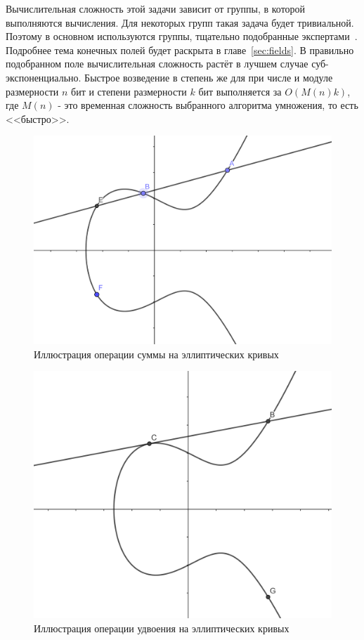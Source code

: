 \documentclass[times,specification,annotation]{itmo-student-thesis}
\begin{document}
Вычислительная сложность этой задачи зависит от группы, в которой выполняются вычисления.
Для некоторых групп такая задача будет тривиальной.
Поэтому в основном используются группы, тщательно подобранные экспертами~\cite{rfc2412}.
Подробнее тема конечных полей будет раскрыта в главе~\ref{sec:fields}.
В правильно подобранном поле вычислительная сложность растёт в лучшем случае суб-экспоненциально.
Быстрое возведение в степень же для при числе и модуле размерности $n$ бит и степени размерности $k$ бит
выполняется за $O(M(n)k)$, где $M(n)$ - это временная сложность выбранного алгоритма умножения, то есть <<быстро>>.

\begin{figure}[!h]
\caption{Иллюстрация операции суммы на эллиптических кривых}\label{fig:ec_sum}
\includegraphics[width=15cm]{graphics/ec_summation.png}
\end{figure}
\begin{figure}[!h]
\caption{Иллюстрация операции удвоения на эллиптических кривых}\label{fig:ec_doub}
\includegraphics[width=15cm]{graphics/ec_doubling.png}
\end{figure}
\end{document}
